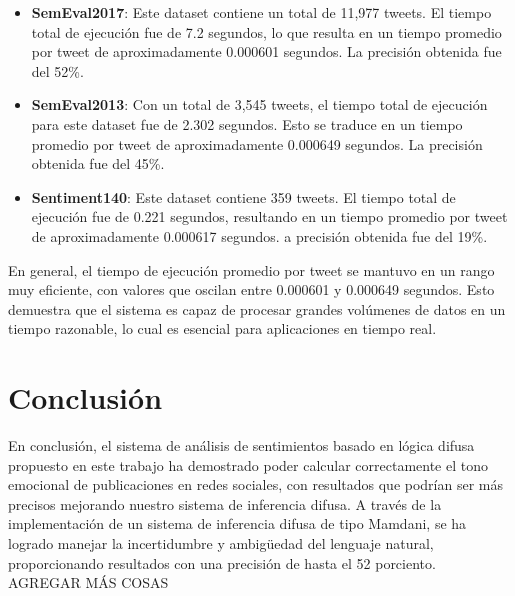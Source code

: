 \documentclass[sigconf, review=false, nonacm]{acmart}
\begin{document}
\begin{itemize}
	\item \textbf{SemEval2017}: Este dataset contiene un total de 11,977 tweets. El tiempo total
		de ejecución fue de 7.2 segundos, lo que resulta en un tiempo promedio por tweet de
		aproximadamente 0.000601 segundos. La precisión obtenida fue del 52\%.

	\item \textbf{SemEval2013}: Con un total de 3,545 tweets, el tiempo total de ejecución para este
	dataset fue de 2.302 segundos. Esto se traduce en un tiempo promedio por tweet de
	aproximadamente 0.000649 segundos. La precisión obtenida fue del 45\%.

	\item \textbf{Sentiment140}: Este dataset contiene 359 tweets. El tiempo total de ejecución
	fue de 0.221 segundos, resultando en un tiempo promedio por tweet de aproximadamente 0.000617 segundos. 
	a precisión obtenida fue del 19\%.
\end{itemize}

En general, el tiempo de ejecución promedio por tweet se mantuvo en un rango muy eficiente, con valores que oscilan entre 0.000601 y 0.000649 segundos. Esto demuestra que el sistema es capaz de procesar grandes volúmenes de datos en un tiempo razonable, lo cual es esencial para aplicaciones en tiempo real.

\section{Conclusión}
En conclusión, el sistema de análisis de sentimientos basado en lógica difusa propuesto en este 
trabajo ha demostrado poder calcular correctamente el tono emocional de publicaciones en redes sociales,
con resultados que podrían ser más precisos mejorando nuestro sistema de inferencia difusa. A través
de la implementación de un sistema de inferencia difusa de tipo Mamdani, se ha logrado manejar la
incertidumbre y ambigüedad del lenguaje natural, proporcionando resultados con una precisión de hasta el 52 porciento.
AGREGAR MÁS COSAS

\nocite{libro, libro2}


\end{document}

